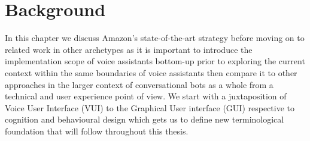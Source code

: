 \chapter{Background}
\label{background}




In this chapter we discuss Amazon's state-of-the-art strategy before moving on to related work in other archetypes as it is important to introduce the implementation scope of voice assistants bottom-up prior to exploring the current context within the same boundaries of voice assistants then compare it to other approaches in the larger context of conversational bots as a whole from a technical and user experience point of view. We start with a juxtaposition of Voice User Interface (VUI) to the Graphical User interface (GUI) respective to cognition and behavioural design which gets us to define new terminological foundation that will follow throughout this thesis.






